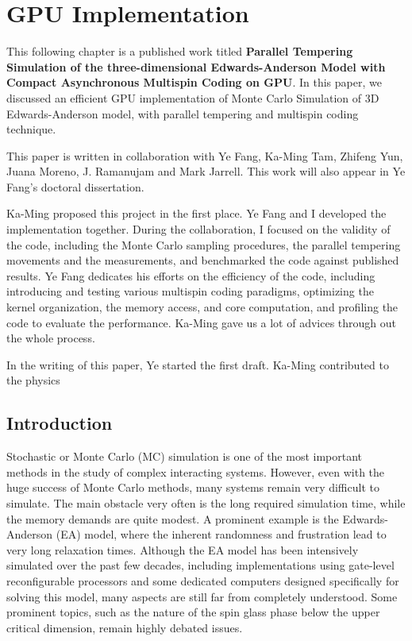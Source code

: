 \chapter{GPU Implementation}


This following chapter is a published work titled {\bf Parallel Tempering Simulation of the three-dimensional Edwards-Anderson Model  with  Compact Asynchronous Multispin Coding on GPU}.
In this paper, we discussed an efficient GPU implementation of Monte Carlo
Simulation of 3D Edwards-Anderson model, with parallel tempering and multispin 
coding technique. 

This paper is written in collaboration with Ye Fang, Ka-Ming Tam, Zhifeng Yun,
Juana Moreno, J. Ramanujam and Mark Jarrell. This work will also appear in 
Ye Fang's doctoral dissertation. 

Ka-Ming proposed this project in the first place. 
Ye Fang and I developed the implementation together. 
During the collaboration, I focused on the validity of the code, including the Monte Carlo
sampling procedures, the parallel tempering movements and the measurements,
and benchmarked the code against published results. Ye Fang dedicates his efforts
 on the efficiency of the code, including introducing and testing various 
multispin coding paradigms, optimizing the kernel organization, the memory access,
and core computation, and profiling the code to evaluate the performance. Ka-Ming
gave us a lot of advices through out the whole process. 

In the writing of this paper, Ye started the first draft. Ka-Ming contributed to
the physics 

\section{Introduction}

Stochastic or Monte Carlo (MC) simulation is one of the most important methods in 
the study of complex interacting systems. However, even with the huge success 
of Monte Carlo methods, many systems remain very difficult to simulate. 
The main obstacle very often is the long required simulation time, while 
the memory demands are quite modest. A prominent example is the Edwards-Anderson (EA) 
model, where the inherent randomness and frustration lead to very long relaxation 
times. Although the EA model has been intensively simulated over the 
past few decades, including implementations using gate-level reconfigurable processors 
\cite{Monaghan-1993} and some dedicated computers designed specifically for solving this model, 
\cite{Ogielski-Morgenstern-1985,Ogielski-1985,Cruz-2001,Condon-Ogielski-1985,Taiji-Ito-Suzuki-1988} 
many aspects are still far from completely understood. Some prominent 
topics, such as the nature of the spin glass phase below the upper critical 
dimension, remain highly debated issues.~\cite{Jorg-Katzgraber-Krzakala-2008,Moore-2005,Young-Katzgraber-2004,Temesvari-2008,Katzgraber-2008,Sasaki-etal-2008,Sasaki-etal-2007,Larson-etal-2013,Banos2012,Katzgraber-2012,Katzgraber-Larson-Young-2009,Leuzzi-2009}

